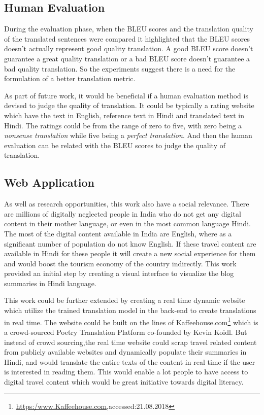 \subsection{Human Evaluation}

During the evaluation phase, when the BLEU scores and the translation quality of the translated sentences were compared it highlighted that the BLEU scores doesn't actually represent good quality translation. A good BLEU score doesn't guarantee a great quality translation or a bad BLEU score doesn't guarantee a bad quality translation. So the experiments suggest there is a need for the formulation of a better translation metric.

As part of future work, it would be beneficial if a human evaluation method is devised to judge the quality of translation. It could be typically a rating website which have the text in English, reference text in Hindi and translated text in Hindi. The ratings could be from the range of zero to five, with zero being a \textit{nonsense translation} while five being a \textit{perfect translation}. And then the human evaluation can be related with the BLEU scores to judge the quality of translation.  

\subsection{Web Application}
As well as research opportunities, this work also have a social relevance. There are millions of digitally neglected people in India who do not get any digital content in their mother language, or even in the most common language Hindi. The most of the digital content available in India are English, where as a significant number of population do not know English. If these travel content are available in Hindi for these people it will create a new social experience for them and would boost the tourism economy of the country indirectly.  This work provided an initial step by creating a visual interface to visualize the blog summaries in Hindi language.

This work could be further extended by creating a real time dynamic website which utilize the trained translation model in the back-end to create translations in real time. The website could be built on the lines of Kaffeehouse.com\footnote{\url{https:/www.Kaffeehouse.com},accessed:21.08.2018} which is a crowd-sourced Poetry Translation Platform co-founded by Kevin Koidl. But instead of crowd sourcing,the real time website could scrap travel related content from publicly available websites and dynamically populate their summaries in Hindi, and would translate the entire texts of the content in real time if the user is interested in reading them. This would enable a lot people to have access to digital travel content which would be great initiative towards digital literacy. 